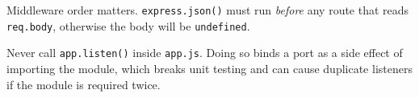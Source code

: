 \begin{notebox}[NOTE]
Middleware order matters. \texttt{express.json()} must run \emph{before} any route that reads \texttt{req.body}, otherwise the body will be \texttt{undefined}.
\end{notebox}

\begin{warnbox}[WARNING]
Never call \texttt{app.listen()} inside \texttt{app.js}. Doing so binds a port as a side effect of importing the module, which breaks unit testing and can cause duplicate listeners if the module is required twice.
\end{warnbox}
